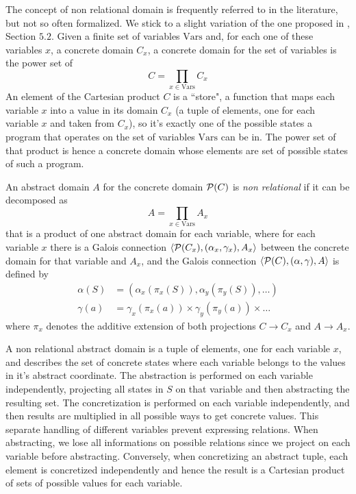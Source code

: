 The concept of non relational domain is frequently referred to in the literature, but not so often formalized. We stick to a slight variation of the one proposed in \cite{giacobazzi-analyzing-analyses}, Section $5.2$.
Given a finite set of variables $\text{Vars}$ and, for each one of these variables $x$, a concrete domain $C_x$, a concrete domain for the set of variables is the power set of
\[
C = \prod\limits_{x \in \text{Vars}} C_x
\]
An element of the Cartesian product $C$ is a ``store", a function that maps each variable $x$ into a value in its domain $C_x$ (a tuple of elements, one for each variable $x$ and taken from $C_x$), so it's exactly one of the possible states a program that operates on the set of variables $\text{Vars}$ can be in. The power set of that product is hence a concrete domain whose elements are set of possible states of such a program.

\begin{definition}
	An abstract domain $A$ for the concrete domain $\mathcal{P}(C)$ is \textit{non relational} if it can be decomposed as
	\[
	A = \prod\limits_{x \in \text{Vars}} A_x
	\]
	that is a product of one abstract domain for each variable, where for each variable $x$ there is a Galois connection $\langle \mathcal{P}(C_x), (\alpha_x, \gamma_x), A_x \rangle$ between the concrete domain for that variable and $A_x$, and the Galois connection $\langle \mathcal{P}(C), (\alpha, \gamma), A \rangle$ is defined by
	\begin{align*}
		\alpha(S) &= (\alpha_x(\pi_x(S)), \alpha_y(\pi_y(S)), \dots) \\
		\gamma(a) &= \gamma_x(\pi_x(a)) \times \gamma_y(\pi_y(a)) \times \dots
	\end{align*}
	where $\pi_x$ denotes the additive extension of both projections $C \rightarrow C_x$ and $A \rightarrow A_x$.
\end{definition}

A non relational abstract domain is a tuple of elements, one for each variable $x$, and describes the set of concrete states where each variable belongs to the values in it's abstract coordinate. The abstraction is performed on each variable independently, projecting all states in $S$ on that variable and then abstracting the resulting set. The concretization is performed on each variable independently, and then results are multiplied in all possible ways to get concrete values.
This separate handling of different variables prevent expressing relations. When abstracting, we lose all informations on possible relations since we project on each variable before abstracting. Conversely, when concretizing an abstract tuple, each element is concretized independently and hence the result is a Cartesian product of sets of possible values for each variable.

